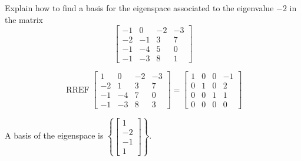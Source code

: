 
\begin{exerciseStatement}


Explain how to find a basis for the eigenspace associated to the eigenvalue \( -2 \) in the matrix \[ \left[\begin{array}{cccc}
-1 & 0 & -2 & -3 \\
-2 & -1 & 3 & 7 \\
-1 & -4 & 5 & 0 \\
-1 & -3 & 8 & 1
\end{array}\right] \]


\end{exerciseStatement}
    
\begin{exerciseAnswer} 


\[\operatorname{RREF} \left[\begin{array}{cccc}
1 & 0 & -2 & -3 \\
-2 & 1 & 3 & 7 \\
-1 & -4 & 7 & 0 \\
-1 & -3 & 8 & 3
\end{array}\right] = \left[\begin{array}{cccc}
1 & 0 & 0 & -1 \\
0 & 1 & 0 & 2 \\
0 & 0 & 1 & 1 \\
0 & 0 & 0 & 0
\end{array}\right] \]



A basis of the eigenspace is \( \left\{ \left[\begin{array}{c}
1 \\
-2 \\
-1 \\
1
\end{array}\right] \right\} \).


\end{exerciseAnswer}
    
